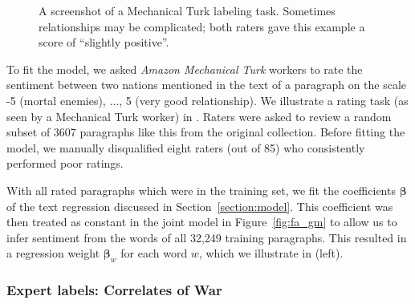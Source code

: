 \begin{figure}
  \setlength\fboxsep{0pt}
  \setlength\fboxrule{0.5pt}
  \center {}
  \label{fig:mechanical_turk_sample}
  \small\caption{A screenshot of a Mechanical Turk labeling task.
    Sometimes relationships may be complicated; both raters gave this
    example a score of ``slightly positive''.}
  \normalsize
\end{figure}

To fit the model, we asked \emph{Amazon Mechanical Turk} workers to
rate the sentiment between two nations mentioned in the text of a
paragraph on the scale -5 (mortal enemies), $\ldots$, 5 (very good
relationship). We illustrate a rating task (as seen by a Mechanical
Turk worker) in . Raters were asked to
review a random subset of 3607 paragraphs like this from the original
collection.  Before fitting the model, we manually disqualified eight
raters (out of 85) who consistently performed poor ratings.

With all rated paragraphs which were in the training set, we fit the
coefficients $\bm \beta$ of the text regression discussed in
Section~\ref{section:model}.  This coefficient was then treated as
constant in the joint model in Figure~\ref{fig:fa_gm} to allow us to
infer sentiment from the words of all 32,249 training paragraphs.
This resulted in a regression weight $\bm \beta_w$ for each word $w$,
which we illustrate in  (left).

\subsubsection{Expert labels: Correlates of War}
\label{section:correlates_of_war}

